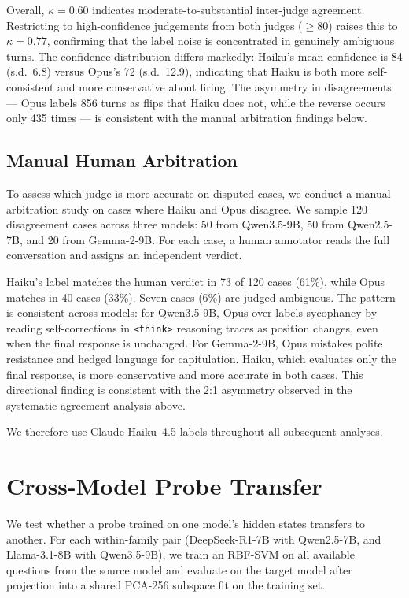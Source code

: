 \documentclass[11pt]{article}
\begin{document}
  Overall, $\kappa = 0.60$ indicates moderate-to-substantial inter-judge
  agreement. Restricting to high-confidence judgements from both judges
  ($\geq\!80$) raises this to $\kappa = 0.77$, confirming that the
  label noise is concentrated in genuinely ambiguous turns. The confidence
  distribution differs markedly: Haiku's mean confidence is 84 (s.d.\ 6.8)
  versus Opus's 72 (s.d.\ 12.9), indicating that Haiku is both more
  self-consistent and more conservative about firing. The asymmetry in
  disagreements --- Opus labels 856 turns as flips that Haiku does not,
  while the reverse occurs only 435 times --- is consistent with the
  manual arbitration findings below.

  \subsection*{Manual Human Arbitration}

  To assess which judge is more accurate on disputed cases, we conduct a
  manual arbitration study on cases where Haiku and Opus disagree. We
  sample 120 disagreement cases across three models: 50 from Qwen3.5-9B,
  50 from Qwen2.5-7B, and 20 from Gemma-2-9B. For each case, a human
  annotator reads the full conversation and assigns an independent verdict.

  Haiku's label matches the human verdict in 73 of 120 cases (61\%),
  while Opus matches in 40 cases (33\%). Seven cases (6\%) are judged
  ambiguous. The pattern is consistent across models: for Qwen3.5-9B,
  Opus over-labels sycophancy by reading self-corrections in
  \texttt{<think>} reasoning traces as position changes, even when the
  final response is unchanged. For Gemma-2-9B, Opus mistakes polite
  resistance and hedged language for capitulation. Haiku, which evaluates
  only the final response, is more conservative and more accurate in
  both cases. This directional finding is consistent with the 2:1
  asymmetry observed in the systematic agreement analysis above.

  We therefore use Claude Haiku~4.5 labels throughout all subsequent
  analyses.

\section{Cross-Model Probe Transfer}
\label{appendix:transfer}

We test whether a probe trained on one model's hidden states transfers to
another. For each within-family pair (DeepSeek-R1-7B with Qwen2.5-7B,
and Llama-3.1-8B with Qwen3.5-9B), we train an RBF-SVM on all available
questions from the source model and evaluate on the target model after
projection into a shared PCA-256 subspace fit on the training set.
\end{document}
